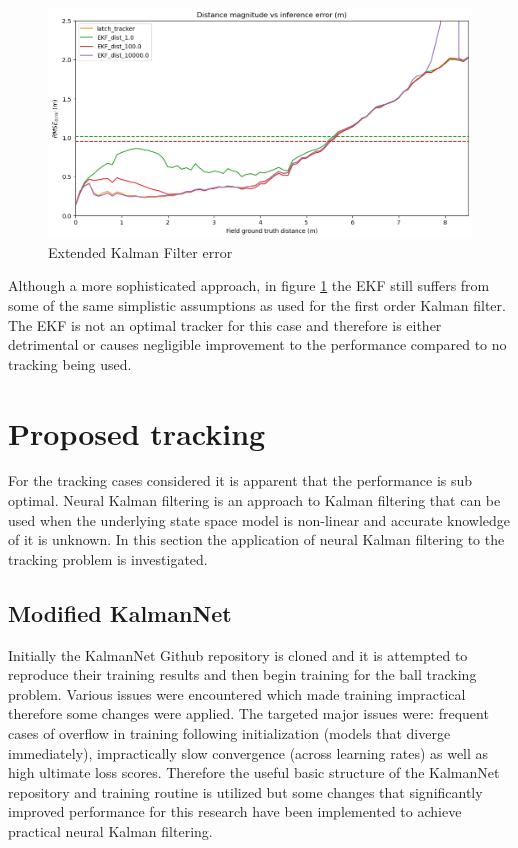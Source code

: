 \documentclass[a4paper,twoside,12pt]{report}
\begin{document}
\begin{figure}[h!]
\begin{center}
\includegraphics[width=12cm]{images/ekf_error.png}
\caption{Extended Kalman Filter error}
\label{fig:ekferror}
\end{center}
\end{figure}

Although a more sophisticated approach, in figure \ref{fig:ekferror} the EKF still suffers from some of the same simplistic assumptions as used for the first order Kalman filter. The EKF is not an optimal tracker for this case and therefore is either detrimental or causes negligible improvement to the performance compared to no tracking being used.

\newpage
\section{Proposed tracking}

For the tracking cases considered it is apparent that the performance is sub optimal. Neural Kalman filtering is an approach to Kalman filtering that can be used when the underlying state space model is non-linear and accurate knowledge of it is unknown. In this section the application of neural Kalman filtering to the tracking problem is investigated.

\subsection{Modified KalmanNet}

Initially the KalmanNet Github repository \cite{kalmangit} is cloned and it is attempted to reproduce their training results and then begin training for the ball tracking problem. Various issues were encountered which made training impractical therefore some changes were applied. The targeted major issues were: frequent cases of overflow in training following initialization (models that diverge immediately), impractically slow convergence (across learning rates) as well as high ultimate loss scores. Therefore the useful basic structure of the KalmanNet repository and training routine is utilized but some changes that significantly improved performance for this research have been implemented to achieve practical neural Kalman filtering. 
\end{document}
